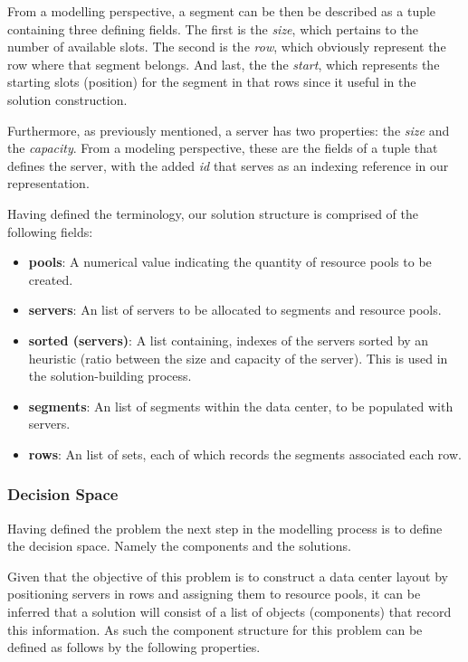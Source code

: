 From a modelling perspective, a segment can be then be described as a tuple
containing three defining fields. The first is the \textit{size}, which pertains
to the number of available slots. The second is the \textit{row}, which
obviously represent the row where that segment belongs. And last, the the
\textit{start}, which represents the starting slots (position) for the segment
in that rows since it useful in the solution construction.

Furthermore, as previously mentioned, a server has two properties: the
\textit{size} and the \textit{capacity}. From a modeling perspective, these are
the fields of a tuple that defines the server, with the added \textit{id} that
serves as an indexing reference in our representation.

Having defined the terminology, our solution structure is comprised of the
following fields:

\begin{itemize}
  \item \textbf{pools}: A numerical value indicating the quantity of resource pools to be created.
  \item \textbf{servers}: An list of servers to be allocated to segments and resource pools.
  \item \textbf{sorted (servers)}: A list containing, indexes of the servers sorted by an
        heuristic (ratio between the size and capacity of the server). This is
        used in the solution-building process.
  \item \textbf{segments}: An list of segments within the data center, to be populated with servers.
  \item \textbf{rows}: An list of sets, each of which records the segments associated each row.
\end{itemize}

\subsubsection{Decision Space}
\label{section:data-center-decision-space}

Having defined the problem the next step in the modelling process is to define
the decision space. Namely the components and the solutions.

Given that the objective of this problem is to construct a data center layout by
positioning servers in rows and assigning them to resource pools, it can be
inferred that a solution will consist of a list of objects (components) that
record this information. As such the component structure for this problem can be
defined as follows by the following properties.

